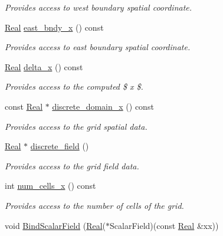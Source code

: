 \begin{DoxyCompactItemize}
\begin{DoxyCompactList}\small\item\em Provides access to west boundary spatial coordinate. \end{DoxyCompactList}\item 
\hyperlink{group__c01-roots_gac080bbbf5cbb5502c9f00405f894857d}{Real} \hyperlink{classmtk_1_1UniStgGrid1D_a3b413aeadcc3d3263f6817f3af1dee95}{east\+\_\+bndy\+\_\+x} () const 
\begin{DoxyCompactList}\small\item\em Provides access to east boundary spatial coordinate. \end{DoxyCompactList}\item 
\hyperlink{group__c01-roots_gac080bbbf5cbb5502c9f00405f894857d}{Real} \hyperlink{classmtk_1_1UniStgGrid1D_a6e7173b01241632cf509496d66b9f74c}{delta\+\_\+x} () const 
\begin{DoxyCompactList}\small\item\em Provides access to the computed \$  x \$. \end{DoxyCompactList}\item 
const \hyperlink{group__c01-roots_gac080bbbf5cbb5502c9f00405f894857d}{Real} $\ast$ \hyperlink{classmtk_1_1UniStgGrid1D_aa1999580cb98c19950e951510871cc90}{discrete\+\_\+domain\+\_\+x} () const 
\begin{DoxyCompactList}\small\item\em Provides access to the grid spatial data. \end{DoxyCompactList}\item 
\hyperlink{group__c01-roots_gac080bbbf5cbb5502c9f00405f894857d}{Real} $\ast$ \hyperlink{classmtk_1_1UniStgGrid1D_ab9c3f9ee2ac76a351b01e4abfede4d19}{discrete\+\_\+field} ()
\begin{DoxyCompactList}\small\item\em Provides access to the grid field data. \end{DoxyCompactList}\item 
int \hyperlink{classmtk_1_1UniStgGrid1D_af1b3729d8afa07be5b2775ed68015b80}{num\+\_\+cells\+\_\+x} () const 
\begin{DoxyCompactList}\small\item\em Provides access to the number of cells of the grid. \end{DoxyCompactList}\item 
void \hyperlink{classmtk_1_1UniStgGrid1D_ab49f0009b66b0a58ae7f70a538f4d12b}{Bind\+Scalar\+Field} (\hyperlink{group__c01-roots_gac080bbbf5cbb5502c9f00405f894857d}{Real}($\ast$Scalar\+Field)(const \hyperlink{group__c01-roots_gac080bbbf5cbb5502c9f00405f894857d}{Real} \&xx))

\end{DoxyCompactItemize}

